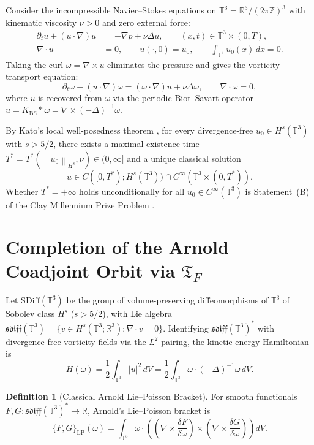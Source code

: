 \documentclass[11pt,reqno]{amsart}
\theoremstyle{definition}
\newtheorem{definition}[theorem]{Definition}
\newcommand{\T}{\mathbb{T}^3}
\newcommand{\R}{\mathbb{R}}
\newcommand{\Z}{\mathbb{Z}}
\newcommand{\SDiff}{\mathrm{SDiff}(\T)}
\newcommand{\sdiff}{\mathfrak{sdiff}(\T)}
\newcommand{\TF}{\mathfrak{T}_F}
\newcommand{\KBS}{K_{\mathrm{BS}}}
\newcommand{\norm}[1]{\left\| #1 \right\|}
\newcommand{\abs}[1]{\left| #1 \right|}
\begin{document}
Consider the incompressible Navier--Stokes equations on $\T = \R^3 / (2\pi\Z)^3$ with kinematic viscosity $\nu > 0$ and zero external force:
\begin{align}
\partial_t u + (u \cdot \nabla) u &= -\nabla p + \nu \Delta u, \qquad (x,t) \in \T \times (0, T), \label{eq:NS_vel}\\
\nabla \cdot u &= 0, \qquad u(\cdot, 0) = u_0, \qquad \int_{\T} u_0(x)\,dx = 0. \label{eq:NS_div}
\end{align}
Taking the curl $\omega = \nabla \times u$ eliminates the pressure and gives the vorticity transport equation:
\begin{equation}\label{eq:vorticity}
\partial_t \omega + (u \cdot \nabla)\omega = (\omega \cdot \nabla)u + \nu \Delta \omega, \qquad \nabla \cdot \omega = 0,
\end{equation}
where $u$ is recovered from $\omega$ via the periodic Biot--Savart operator $u = \KBS * \omega = \nabla \times (-\Delta)^{-1}\omega$.

By Kato's local well-posedness theorem \cite{Kato1972}, for every divergence-free $u_0 \in H^s(\T)$ with $s > 5/2$, there exists a maximal existence time $T^* = T^*(\norm{u_0}_{H^s}, \nu) \in (0, \infty]$ and a unique classical solution
\[
u \in C([0, T^*); H^s(\T)) \cap C^\infty(\T \times (0, T^*)).
\]
Whether $T^* = +\infty$ holds unconditionally for all $u_0 \in C^\infty(\T)$ is Statement~(B) of the Clay Millennium Prize Problem \cite{Fefferman2000}.

\section{Completion of the Arnold Coadjoint Orbit via $\TF$}

Let $\SDiff$ be the group of volume-preserving diffeomorphisms of $\T$ of Sobolev class $H^s$ ($s > 5/2$), with Lie algebra $\sdiff = \{v \in H^s(\T; \R^3) : \nabla \cdot v = 0\}$. Identifying $\sdiff^*$ with divergence-free vorticity fields via the $L^2$ pairing, the kinetic-energy Hamiltonian is
\begin{equation}\label{eq:Hamiltonian}
H(\omega) = \frac{1}{2} \int_{\T} \abs{u}^2 \, dV = \frac{1}{2} \int_{\T} \omega \cdot (-\Delta)^{-1}\omega \, dV.
\end{equation}

\begin{definition}[Classical Arnold Lie--Poisson Bracket]\label{def:arnold}
For smooth functionals $F, G : \sdiff^* \to \R$, Arnold's Lie--Poisson bracket is
\begin{equation}\label{eq:arnold_bracket}
\{F, G\}_{\mathrm{LP}}(\omega) = \int_{\T} \omega \cdot \left( \left(\nabla \times \frac{\delta F}{\delta \omega}\right) \times \left(\nabla \times \frac{\delta G}{\delta \omega}\right) \right) dV.
\end{equation}
\end{definition}
\end{document}
